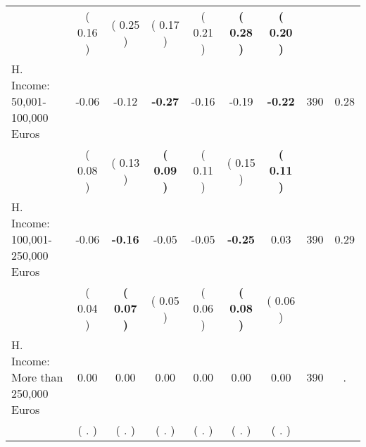 \begin{tabular}{lcccccccc}
 & (     0.16 ) & (     0.25 ) & (     0.17 ) & (     0.21 ) & \textbf{(     0.28 )} & \textbf{(     0.20 )} & \\
H. Income: 50,001-100,000 Euros &     -0.06 &     -0.12 & \textbf{    -0.27} &     -0.16 &     -0.19 & \textbf{    -0.22} & 390 &       0.28 \\ 
 & (     0.08 ) & (     0.13 ) & \textbf{(     0.09 )} & (     0.11 ) & (     0.15 ) & \textbf{(     0.11 )} & \\
H. Income: 100,001-250,000 Euros &     -0.06 & \textbf{    -0.16} &     -0.05 &     -0.05 & \textbf{    -0.25} &      0.03 & 390 &       0.29 \\ 
 & (     0.04 ) & \textbf{(     0.07 )} & (     0.05 ) & (     0.06 ) & \textbf{(     0.08 )} & (     0.06 ) & \\
H. Income: More than 250,000 Euros &      0.00 &      0.00 &      0.00 &      0.00 &      0.00 &      0.00 & 390 &          . \\ 
 & (        . ) & (        . ) & (        . ) & (        . ) & (        . ) & (        . ) & \\
\bottomrule
\end{tabular}

